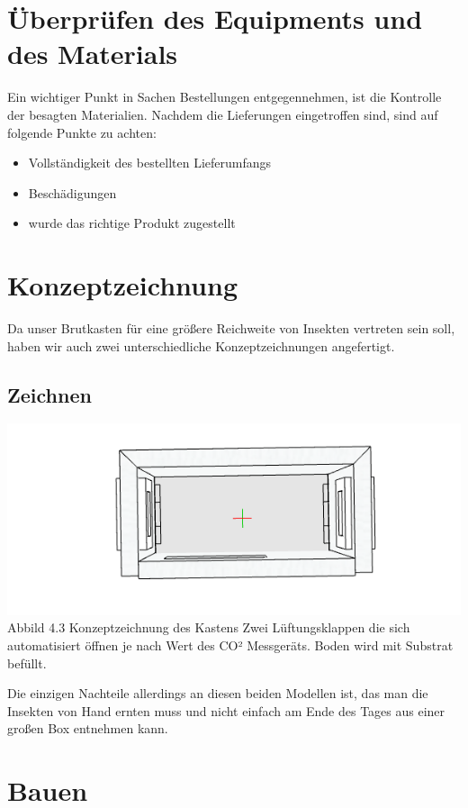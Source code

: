 \section{Überprüfen des Equipments und des Materials}
Ein wichtiger Punkt in Sachen Bestellungen entgegennehmen, ist  die Kontrolle der besagten Materialien. Nachdem die Lieferungen eingetroffen sind, sind auf folgende Punkte zu achten:

\begin{itemize}
	\item Vollständigkeit des bestellten Lieferumfangs
	\item Beschädigungen
	\item wurde das richtige Produkt zugestellt
\end{itemize}

\section{Konzeptzeichnung}
Da unser Brutkasten für eine größere Reichweite von Insekten vertreten sein soll, haben wir auch zwei unterschiedliche Konzeptzeichnungen angefertigt.
\subsection{Zeichnen}

\includegraphics[width=0.9\linewidth]{figures/Grundriss.PNG}\\
Abbild 4.3 Konzeptzeichnung des Kastens
Zwei Lüftungsklappen die sich automatisiert öffnen je nach Wert des CO² Messgeräts. Boden wird mit Substrat befüllt. 

Die einzigen Nachteile allerdings an diesen beiden Modellen ist, das man die Insekten von Hand ernten muss und nicht einfach am Ende des Tages aus einer großen Box entnehmen kann.

\section{Bauen}

